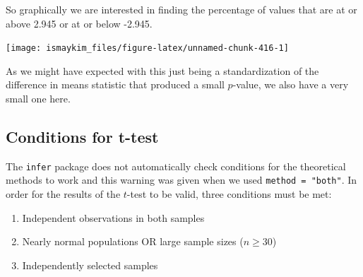\documentclass[12pt,]{krantz}
\makeatletter
\newenvironment{Shaded}{\begin{snugshade}}{\end{snugshade}}
\newcommand{\KeywordTok}[1]{\textcolor[rgb]{0.27,0.27,0.27}{\textbf{#1}}}
\newcommand{\DataTypeTok}[1]{\textcolor[rgb]{0.27,0.27,0.27}{#1}}
\newcommand{\StringTok}[1]{\textcolor[rgb]{0.5,0.5,0.5}{#1}}
\newcommand{\OperatorTok}[1]{\textcolor[rgb]{0.43,0.43,0.43}{\textbf{#1}}}
\newcommand{\NormalTok}[1]{#1}
\providecommand{\tightlist}{%
  \setlength{\itemsep}{0pt}\setlength{\parskip}{0pt}}
\newenvironment{kframe}{%
\medskip{}
\setlength{\fboxsep}{.8em}
 \def\at@end@of@kframe{}%
 \ifinner\ifhmode%
  \def\at@end@of@kframe{\end{minipage}}%
  \begin{minipage}{\columnwidth}%
 \fi\fi%
 \def\FrameCommand##1{\hskip\@totalleftmargin \hskip-\fboxsep
 \colorbox{shadecolor}{##1}\hskip-\fboxsep
     \hskip-\linewidth \hskip-\@totalleftmargin \hskip\columnwidth}%
 \MakeFramed {\advance\hsize-\width
   \@totalleftmargin\z@ \linewidth\hsize
   \@setminipage}}%
 {\par\unskip\endMakeFramed%
 \at@end@of@kframe}
\renewenvironment{Shaded}{\begin{kframe}}{\end{kframe}}
\theoremstyle{definition}
\theoremstyle{definition}
\theoremstyle{definition}
\theoremstyle{remark}
\makeatother
\begin{document}
\begin{Shaded}
\end{Shaded}

So graphically we are interested in finding the percentage of values
that are at or above 2.945 or at or below -2.945.

\begin{Shaded}
\end{Shaded}

\begin{center}\texttt{[image: ismaykim\_files/figure-latex/unnamed-chunk-416-1]} \end{center}

As we might have expected with this just being a standardization of the
difference in means statistic that produced a small \(p\)-value, we also
have a very small one here.

\subsection{Conditions for t-test}\label{conditions-for-t-test}

The \texttt{infer} package does not automatically check conditions for
the theoretical methods to work and this warning was given when we used
\texttt{method\ =\ "both"}. In order for the results of the \(t\)-test
to be valid, three conditions must be met:

\begin{enumerate}
\def\labelenumi{\arabic{enumi}.}
\tightlist
\item
  Independent observations in both samples
\item
  Nearly normal populations OR large sample sizes (\(n \ge 30\))
\item
  Independently selected samples
\end{enumerate}
\end{document}
